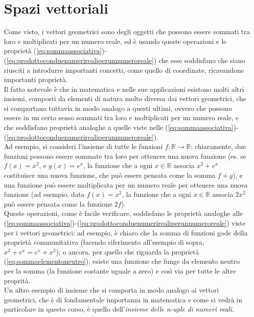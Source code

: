 \documentclass{book}
\theoremstyle{definition}
\theoremstyle{plain}
\begin{document}
\section{Spazi vettoriali}
\label{sec:spazivect}

Come visto, i vettori geometrici sono degli oggetti che possono essere sommati tra loro e moltiplicati per un numero reale, ed è usando queste operazioni e le proprietà (\ref{eq:sommaassociativa})-(\ref{eq:prodottoconduenumerirealiperunnumeroreale}) che esse soddisfano che siano riusciti a introdurre importanti concetti, come quello di coordinate, ricavandone importanti proprietà.\\
Il fatto notevole è che in matematica e nelle sue applicazioni esistono molti altri insiemi, composti da elementi di natura molto diversa dai vettori geometrici, che si comportano tuttavia in modo analogo a questi ultimi, ovvero che possono essere in un certo senso sommati tra loro e moltiplicati per un numero reale, e che soddisfano proprietà analoghe a quelle viste nelle (\ref{eq:sommaassociativa})-(\ref{eq:prodottoconduenumerirealiperunnumeroreale}).\\
Ad esempio, si consideri l'insieme di tutte le funzioni $f:\mathds{R}\to \mathds{R}$: chiaramente, due funzioni possono essere sommate tra loro per ottenere una nuova funzione (es. se $f(x)=x^2$, e $g(x)=e^x$, la funzione che a ogni $x\in \mathds{R}$ associa $x^2+e^x$ costituisce una nuova funzione, che può essere pensata come la somma $f+g$), e una funzione può essere moltiplicata per un numero reale per ottenere una nuova funzione (ad esempio, data $f(x)=x^2$, la funzione che a ogni $x\in \mathds{R}$ associa $2x^2$ può essere pensata come la funzione $2f$).\\
Queste operazioni, come è facile verificare, soddisfano le proprietà analoghe alle (\ref{eq:sommaassociativa})-(\ref{eq:prodottoconduenumerirealiperunnumeroreale}) viste per i vettori geometrici: ad esempio, è chiaro che la somma di funzioni gode della proprietà communitativa (facendo riferimento all'esempio di sopra, $x^2+e^x=e^x+x^2$); o ancora, per quello che riguarda la proprietà (\ref{eq:sommaelementoneutro}), esiste una funzione che funge da elemento neutro per la somma (la funzione costante uguale a zero) e così via per tutte le altre proprità.\\
Un altro esempio di insieme che si comporta in modo analogo ai vettori geometrici, che è di fondamentale importanza in matematica e come si vedrà in particolare in questo corso, è quello dell'\textit{insieme delle n-uple di numeri reali.}\\
\end{document}
